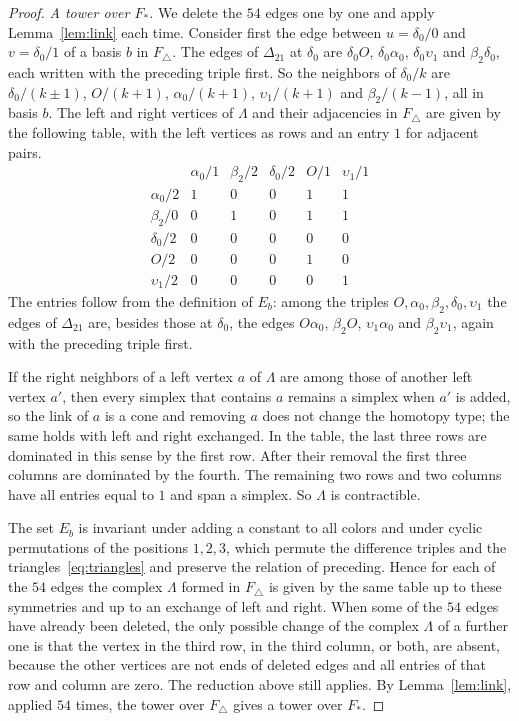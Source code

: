 \begin{proof}
\emph{A tower over $F_*$.} We delete the $54$ edges one by one and apply Lemma~\ref{lem:link} each time. Consider first the edge between $u=\delta_0/0$ and $v=\delta_0/1$ of a basis $b$ in $F_\triangle$. The edges of $\Delta_{21}$ at $\delta_0$ are $\delta_0O$, $\delta_0\alpha_0$, $\delta_0\upsilon_1$ and $\beta_2\delta_0$, each written with the preceding triple first. So the neighbors of $\delta_0/k$ are $\delta_0/(k\pm1)$, $O/(k+1)$, $\alpha_0/(k+1)$, $\upsilon_1/(k+1)$ and $\beta_2/(k-1)$, all in basis $b$. The left and right vertices of $\Lambda$ and their adjacencies in $F_\triangle$ are given by the following table, with the left vertices as rows and an entry $1$ for adjacent pairs.
\[
\begin{array}{c|ccccc}
  &\alpha_0/1&\beta_2/2&\delta_0/2&O/1&\upsilon_1/1\\ \hline
\alpha_0/2&1&0&0&1&1\\
\beta_2/0&0&1&0&1&1\\
\delta_0/2&0&0&0&0&0\\
O/2&0&0&0&1&0\\
\upsilon_1/2&0&0&0&0&1
\end{array}
\]
The entries follow from the definition of $E_b$: among the triples $O,\alpha_0,\beta_2,\delta_0,\upsilon_1$ the edges of $\Delta_{21}$ are, besides those at $\delta_0$, the edges $O\alpha_0$, $\beta_2O$, $\upsilon_1\alpha_0$ and $\beta_2\upsilon_1$, again with the preceding triple first.

If the right neighbors of a left vertex $a$ of $\Lambda$ are among those of another left vertex $a'$, then every simplex that contains $a$ remains a simplex when $a'$ is added, so the link of $a$ is a cone and removing $a$ does not change the homotopy type; the same holds with left and right exchanged. In the table, the last three rows are dominated in this sense by the first row. After their removal the first three columns are dominated by the fourth. The remaining two rows and two columns have all entries equal to $1$ and span a simplex. So $\Lambda$ is contractible.

The set $E_b$ is invariant under adding a constant to all colors and under cyclic permutations of the positions $1,2,3$, which permute the difference triples and the triangles~\eqref{eq:triangles} and preserve the relation of preceding. Hence for each of the $54$ edges the complex $\Lambda$ formed in $F_\triangle$ is given by the same table up to these symmetries and up to an exchange of left and right. When some of the $54$ edges have already been deleted, the only possible change of the complex $\Lambda$ of a further one is that the vertex in the third row, in the third column, or both, are absent, because the other vertices are not ends of deleted edges and all entries of that row and column are zero. The reduction above still applies. By Lemma~\ref{lem:link}, applied $54$ times, the tower over $F_\triangle$ gives a tower over $F_*$.


\end{proof}
